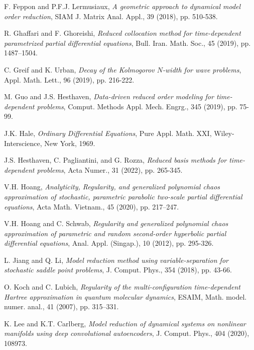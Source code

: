 \documentclass[10pt,a4paper]{article}
\numberwithin{equation}{section}
\numberwithin{lemma}{section}
\numberwithin{example}{section}
\numberwithin{definition}{section}
\numberwithin{assumption}{section}
\numberwithin{theorem}{section}
\numberwithin{proposition}{section}
\numberwithin{corollary}{section}
\numberwithin{remark}{section}
\begin{document}
\begin{thebibliography}{}
    {\sc F. Feppon and P.F.J. Lermusiaux}, {\em A geometric approach to dynamical model order reduction}, SIAM J. Matrix Anal. Appl., 39 (2018), pp. 510-538.

      
    {\sc R. Ghaffari and F. Ghoreishi}, {\em Reduced collocation method for time-dependent parametrized partial differential equations}, Bull. Iran. Math. Soc., 45 (2019), pp. 1487–1504.

    {\sc C. Greif and K. Urban}, {\em Decay of the Kolmogorov $N$-width for wave problems}, Appl. Math. Lett., 96 (2019), pp. 216-222.
    
    {\sc M. Guo and J.S. Hesthaven}, {\em Data-driven reduced order modeling for time-dependent problems}, Comput. Methods Appl. Mech. Engrg., 345 (2019), pp. 75-99.


    {\sc J.K. Hale}, {\em Ordinary Diﬀerential Equations}, Pure Appl. Math. XXI, Wiley-Interscience, New York, 1969.

   
    {\sc J.S. Hesthaven, C. Pagliantini, and G. Rozza}, {\em Reduced basis methods for time-dependent problems}, Acta Numer., 31 (2022), pp. 265-345.

    {\sc V.H. Hoang}, {\em Analyticity, Regularity, and generalized polynomial chaos approximation of stochastic, parametric parabolic two-scale partial differential equations}, Acta Math. Vietnam., 45 (2020), pp. 217–247.
    
    {\sc V.H. Hoang and C. Schwab}, {\em  Regularity and generalized polynomial chaos approximation of parametric and random second-order hyperbolic partial differential equations}, Anal. Appl. (Singap.), 10 (2012), pp. 295-326.


    {\sc L. Jiang and Q. Li}, {\em Model reduction method using variable-separation for stochastic saddle point problems}, J. Comput. Phys., 354 (2018), pp. 43-66.
    
    {\sc O. Koch and C. Lubich}, {\em Regularity of the multi-configuration time-dependent Hartree approximation in quantum molecular dynamics}, ESAIM, Math. model. numer. anal., 41 (2007), pp. 315–331.

    {\sc K. Lee and K.T. Carlberg}, {\em Model reduction of dynamical systems on nonlinear manifolds using deep convolutional autoencoders}, J. Comput. Phys., 404 (2020), 108973.



\end{thebibliography}
\end{document}
